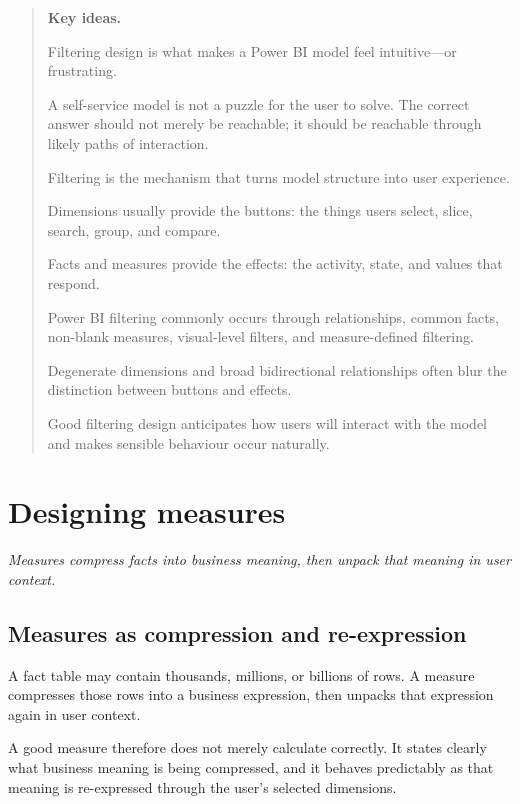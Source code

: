 \documentclass[10pt,openany,10pt]{book}
\begin{document}
\begin{quote}
\textbf{Key ideas.}

Filtering design is what makes a Power BI model feel intuitive---or
frustrating.

A self-service model is not a puzzle for the user to solve. The correct
answer should not merely be reachable; it should be reachable through
likely paths of interaction.

Filtering is the mechanism that turns model structure into user
experience.

Dimensions usually provide the buttons: the things users select, slice,
search, group, and compare.

Facts and measures provide the effects: the activity, state, and values
that respond.

Power BI filtering commonly occurs through relationships, common facts,
non-blank measures, visual-level filters, and measure-defined filtering.

Degenerate dimensions and broad bidirectional relationships often blur
the distinction between buttons and effects.

Good filtering design anticipates how users will interact with the model
and makes sensible behaviour occur naturally.
\end{quote}

\newpage

\chapter{Designing
measures}\label{docs-presenting-insights-designing-measures}

\emph{Measures compress facts into business meaning, then unpack that
meaning in user context.}

\section{Measures as compression and
re-expression}\label{measures-as-compression-and-re-expression}

A fact table may contain thousands, millions, or billions of rows. A
measure compresses those rows into a business expression, then unpacks
that expression again in user context.

A good measure therefore does not merely calculate correctly. It states
clearly what business meaning is being compressed, and it behaves
predictably as that meaning is re-expressed through the user's selected
dimensions.
\end{document}

